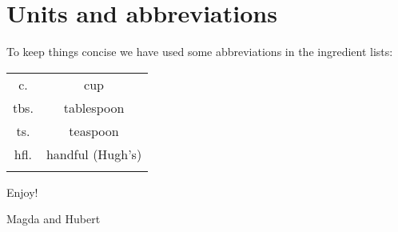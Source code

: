 \section*{Units and abbreviations}
To keep things concise we have used some abbreviations in the ingredient lists:
\begin{table}[h]
\centering
\begin{tabular}{cc}
    c.	& cup                     \\
    tbs. & tablespoon                     \\
    ts.	& teaspoon                    \\
    hfl. & handful (Hugh's) \\
    \multicolumn{1}{l}{} & \multicolumn{1}{l}{}
\end{tabular}
\end{table}

\vspace{2cm}
Enjoy!

Magda and Hubert